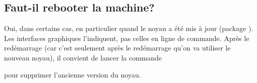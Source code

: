\subsection{Faut-il rebooter la machine?}
Oui, dans certains cas, en particulier quand le noyau a été mis à jour
(package ). Les interfaces graphiques l'indiquent, pas
celles en ligne de commande.
Après le redémarrage (car c'est seulement après le redémarrage qu'on
va utiliser le nouveau noyau), il convient de lancer la commande 

\begin{center}
\end{center}

pour supprimer l'ancienne version du noyau.
